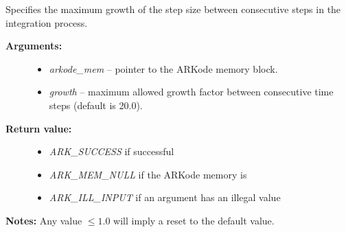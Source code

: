 \documentclass[letterpaper,10pt,english]{sphinxmanual}
\begin{document}
\begin{fulllineitems}
\label{c_interface/User_callable:ARKodeSetMaxGrowth}
Specifies the maximum growth of the step size between consecutive
steps in the integration process.
\begin{description}
\item[{\textbf{Arguments:}}] \leavevmode\begin{itemize}
\item {} 
\emph{arkode\_mem} -- pointer to the ARKode memory block.

\item {} 
\emph{growth} -- maximum allowed growth factor between consecutive time steps (default is 20.0).

\end{itemize}

\item[{\textbf{Return value:}}] \leavevmode\begin{itemize}
\item {} 
\emph{ARK\_SUCCESS} if successful

\item {} 
\emph{ARK\_MEM\_NULL} if the ARKode memory is 

\item {} 
\emph{ARK\_ILL\_INPUT} if an argument has an illegal value

\end{itemize}

\end{description}

\textbf{Notes:} Any value $\le 1.0$ will imply a reset to the default
value.

\end{fulllineitems}

\end{document}
